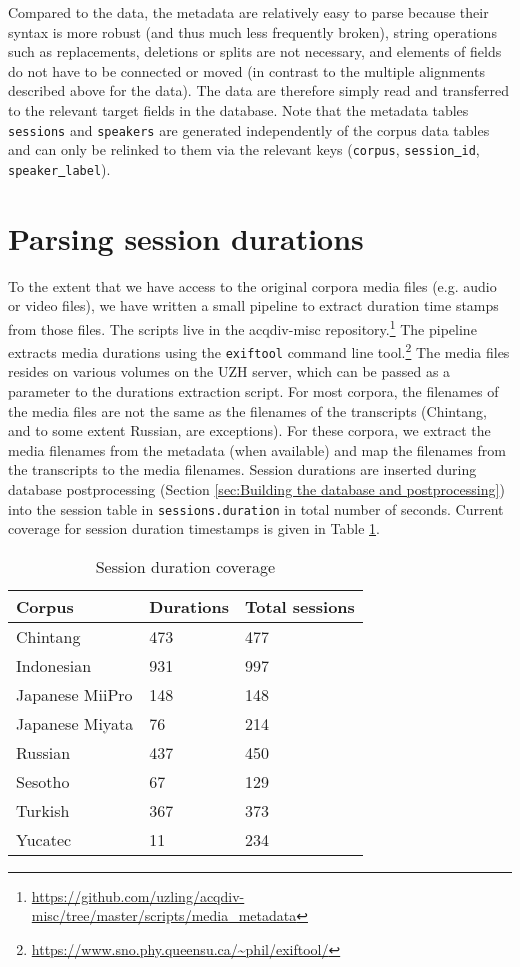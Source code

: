 \documentclass[a4paper, 11pt]{book}
\newcommand{\und}{\underline{{ }}\hspace{0.2mm}}	%
\begin{document}
Compared to the data, the metadata are relatively easy to parse because their syntax is more robust (and thus much less frequently broken), string operations such as replacements, deletions or splits are not necessary, and elements of fields do not have to be connected or moved (in contrast to the multiple alignments described above for the data). The data are therefore simply read and transferred to the relevant target fields in the database. Note that the metadata tables \texttt{sessions} and \texttt{speakers} are generated independently of the corpus data tables and can only be relinked to them via the relevant keys (\texttt{corpus}, \texttt{session\und id}, \texttt{speaker\und label}). 


\section{Parsing session durations}
\label{sec:Parsing session durations}

To the extent that we have access to the original corpora media files (e.g. audio or video files), we have written a small pipeline to extract duration time stamps from those files. The scripts live in the acqdiv-misc repository.\footnote{\url{https://github.com/uzling/acqdiv-misc/tree/master/scripts/media_metadata}} The pipeline extracts media durations using the \texttt{exiftool} command line tool.\footnote{\url{https://www.sno.phy.queensu.ca/~phil/exiftool/}} The media files resides on various volumes on the UZH server, which can be passed as a parameter to the durations extraction script. For most corpora, the filenames of the media files are not the same as the filenames of the transcripts (Chintang, and to some extent Russian, are exceptions). For these corpora, we extract the media filenames from the metadata (when available) and map the filenames from the transcripts to the media filenames. Session durations are inserted during database postprocessing (Section \ref{sec:Building the database and postprocessing}) into the session table in \texttt{sessions.duration} in total number of seconds. Current coverage for session duration timestamps is given in Table \ref{tab:Session duration coverage}.

\begin{table}[ht!]
	\centering
	\begin{tabular}{lll}
		\toprule
			\textbf{Corpus} & \textbf{Durations} & \textbf{Total sessions} \\
		\midrule
Chintang & 473 & 477 \\
Indonesian & 931 & 997 \\
Japanese MiiPro & 148 & 148 \\
Japanese Miyata & 76 & 214 \\
Russian & 437 & 450 \\
Sesotho & 67 & 129 \\
Turkish & 367 & 373 \\
Yucatec & 11 & 234 \\
		\bottomrule
	\end{tabular}
	\caption{Session duration coverage}
	\label{tab:Session duration coverage}
\end{table}
\end{document}
